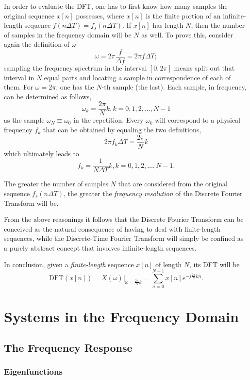 \documentclass[\documentfontsize, twocolumn]{\classname}
\begin{document}
In order to evaluate the DFT, one has to first know how many samples the original sequence $x[n]$ possesses, where $x[n]$ is the finite portion of an infinite-length sequence $f(n\Delta T) = f_s(n \Delta T)$. If $x[n]$ has length $N$, then the number of samples in the frequency domain will be $N$ as well. To prove this, consider again the definition of $\omega$
\[
    \omega = 2\pi \frac f {\Delta f} = 2\pi f \Delta T;
\]
sampling the frequency spectrum in the interval $[0, 2\pi]$ means split out that interval in $N$ equal parts and locating a sample in correspondence of each of them. For $\omega = 2\pi$, one has the $N$-th sample (the last). Each sample, in frequency, can be determined as follows,
\[
    \omega_k = \frac {2\pi}{N} k, k = 0,1,2,\dots,N-1
\]
as the sample $\omega_N \equiv \omega_0$ in the repetition. Every $\omega_k$ will correspond to a physical frequency $f_k$ that can be obtained by equaling the two definitions,
\[
    2\pi f_k \Delta T = \frac{2\pi}{N}k
\]
which ultimately leads to
\[
    f_k = \frac{1}{N\Delta T}k, k = 0,1,2,\dots,N-1.
\]

The greater the number of samples $N$ that are considered from the original sequence $f_s(n\Delta T)$, the greater the \emph{frequency resolution} of the Discrete Fourier Transform will be.

From the above reasonings it follows that the Discrete Fourier Transform can be conceived as the natural consequence of having to deal with finite-length sequences, while the Discrete-Time Fourier Transform will simply be confined as a purely abstract concept that involves infinite-length sequences.

In conclusion, given a \emph{finite-length} sequence $x[n]$ of length $N$, its DFT will be
\[
    \mbox{DFT}(x[n]) = X(\omega)\Bigr\rvert_{\omega = \frac{2\pi}{N}k} = \sum_{n=0}^{N-1} x[n] e^{-j\frac{2\pi}{N}kn}.
\]



\part{Systems in the Frequency Domain}

\chapter{The Frequency Response}
\section{Eigenfunctions}
\end{document}

